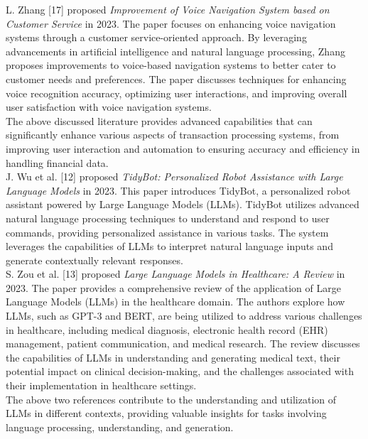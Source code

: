 \noindent
L. Zhang [17] proposed {\it Improvement of Voice Navigation System based on Customer Service} in 2023. 
\noindent
The paper focuses on enhancing voice navigation systems through a customer service-oriented approach. By leveraging advancements in artificial intelligence and natural language processing, Zhang proposes improvements to voice-based navigation systems to better cater to customer needs and preferences. The paper discusses techniques for enhancing voice recognition accuracy, optimizing user interactions, and improving overall user satisfaction with voice navigation systems.\\

\noindent The above discussed literature provides advanced capabilities that  can significantly enhance various aspects of transaction processing systems, from improving user interaction and automation to ensuring accuracy and efficiency in handling financial data. \\

\noindent
J. Wu et al. [12] proposed {\it TidyBot: Personalized Robot Assistance with Large Language Models} in 2023.
\noindent
This paper introduces TidyBot, a personalized robot assistant powered by Large Language Models (LLMs). TidyBot utilizes advanced natural language processing techniques to understand and respond to user commands, providing personalized assistance in various tasks. The system leverages the capabilities of LLMs to interpret natural language inputs and generate contextually relevant responses.\\

\noindent
S. Zou et al. [13] proposed {\it Large Language Models in Healthcare: A Review} in 2023. 
\noindent
The paper provides a comprehensive review of the application of Large Language Models (LLMs) in the healthcare domain. The authors explore how LLMs, such as GPT-3 and BERT, are being utilized to address various challenges in healthcare, including medical diagnosis, electronic health record (EHR) management, patient communication, and medical research. The review discusses the capabilities of LLMs in understanding and generating medical text, their potential impact on clinical decision-making, and the challenges associated with their implementation in healthcare settings.\\

\noindent
The above two references contribute to the understanding and utilization of LLMs in different contexts, providing valuable insights for tasks involving language processing, understanding, and generation.\\

